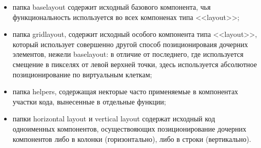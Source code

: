 \begin{itemize}
    \item папка baselayout содержит исходный базового компонента, чья функциональность используется во всех компоненах типа <<layout>>;
    \item папка gridlayout, содержит исходный особого компонента типа <<layout>>, который использует совершенно другой способ позиционироваия дочерних элементов, нежели baselayout: в отличие от последнего, где используется смещение в пикселях от левой верхней точки, здесь используется абсолютное позиционирование по виртуальным клеткам;
    \item папка helpers, содержащая некторые часто применяемые в компонентах участки кода, вынесенные в отдельные функции;
    \item папки horizontal layout и vertical layout содержат исходный код одноименных компонентов, осуществояющих позиционирование дочерних компонентов либо в колонки (горизонтально), либо в строки (вертикально).
\end{itemize}

    